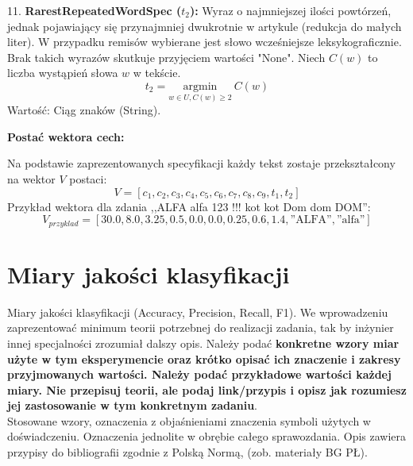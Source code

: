 \documentclass{article}
\begin{document}
11. \textbf{RarestRepeatedWordSpec ($t_2$):} Wyraz o najmniejszej ilości powtórzeń, jednak pojawiający się przynajmniej dwukrotnie w artykule (redukcja do małych liter). W przypadku remisów wybierane jest słowo wcześniejsze leksykograficznie. Brak takich wyrazów skutkuje przyjęciem wartości "None".
    Niech $C(w)$ to liczba wystąpień słowa $w$ w tekście.
    \begin{equation}
    t_2 = \underset{w \in U, C(w) \ge 2}{\mathrm{argmin}}\ C(w)
    \end{equation}
    Wartość: Ciąg znaków (String).

\textbf{Postać wektora cech:}

Na podstawie zaprezentowanych specyfikacji każdy tekst zostaje przekształcony na wektor $V$ postaci:
\begin{equation}
V = [c_1, c_2, c_3, c_4, c_5, c_6, c_7, c_8, c_9, t_1, t_2]
\end{equation}
Przykład wektora dla zdania ,,ALFA alfa 123 !!! kot kot Dom dom DOM'':
\begin{equation}
V_{przyklad} = [30.0, 8.0, 3.25, 0.5, 0.0, 0.0, 0.25, 0.6, 1.4, \text{''ALFA''}, \text{''alfa''}]
\end{equation}

\section{Miary jakości klasyfikacji}
Miary jakości klasyfikacji (Accuracy, Precision,
Recall, F1). We wprowadzeniu zaprezentować minimum teorii potrzebnej do realizacji
zadania, tak by inżynier innej specjalności zrozumiał dalszy opis. Należy podać {\bf konkretne wzory miar użyte w tym eksperymencie oraz krótko
opisać ich znaczenie i zakresy przyjmowanych wartości. Należy podać przykładowe
wartości każdej miary. Nie przepisuj
teorii, ale podaj link/przypis i opisz jak rozumiesz jej zastosowanie w tym konkretnym
zadaniu}. \\
\indent Stosowane wzory, oznaczenia z objaśnieniami znaczenia symboli użytych w
doświadczeniu. Oznaczenia jednolite w obrębie całego sprawozdania.  Opis zawiera przypisy do bibliografii zgodnie z
Polską Normą, (zob. materiały BG PŁ).\\
\end{document}

